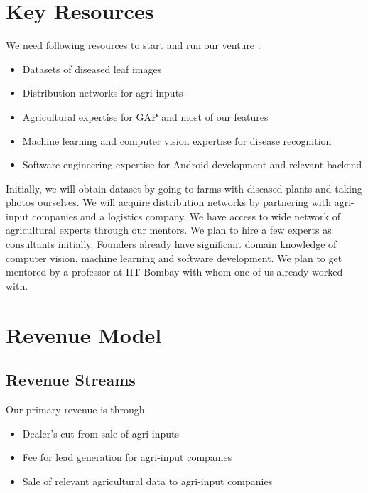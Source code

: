 \documentclass[a4paper]{article}
\begin{document}
\section{Key Resources}
We need following resources to start and run our venture :
\begin{itemize}
\item Datasets of diseased leaf images
\item Distribution networks for agri-inputs
\item Agricultural expertise for GAP and most of our features
\item Machine learning and computer vision expertise for disease recognition 
\item Software engineering expertise for Android development and relevant backend
\end{itemize}

Initially, we will obtain dataset by going to farms with diseased plants and taking photos ourselves.
We will acquire distribution networks by partnering with agri-input companies and a logistics company. 
We have access to wide network of agricultural experts through our mentors. We plan to hire a few experts as consultants initially.
Founders already have significant domain knowledge of computer vision, machine learning and software development. 
We plan to get mentored by a professor at IIT Bombay with whom one of us already worked with.

\section{Revenue Model}
\subsection{Revenue Streams}
Our primary revenue is through
\begin{itemize}
\item Dealer's cut from sale of agri-inputs
\item Fee for lead generation for agri-input companies
\item Sale of relevant agricultural data to agri-input companies
\end{itemize}
\end{document}
